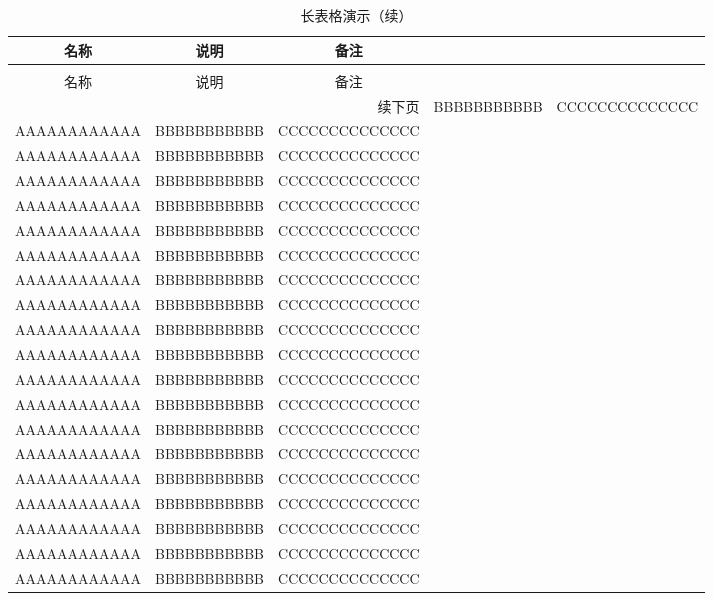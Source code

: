 \begin{longtable}[h]{ccc}
  \caption[长表格演示]{长表格演示}
  \label{tab:longtable}\\
  \toprule
  名称  & 说明 & 备注\\
  \midrule
  \endfirsthead
  \caption[]{长表格演示（续）} \\
  \toprule
  名称  & 说明 & 备注 \\
  \midrule
  \endhead
  \hline
  \multicolumn{3}{r}{\small 续下页}
  \endfoot
  \bottomrule
  \endlastfoot
  
  AAAAAAAAAAAA   &   BBBBBBBBBBB   &   CCCCCCCCCCCCCC   \\
  AAAAAAAAAAAA   &   BBBBBBBBBBB   &   CCCCCCCCCCCCCC   \\
  AAAAAAAAAAAA   &   BBBBBBBBBBB   &   CCCCCCCCCCCCCC   \\
  AAAAAAAAAAAA   &   BBBBBBBBBBB   &   CCCCCCCCCCCCCC   \\
  AAAAAAAAAAAA   &   BBBBBBBBBBB   &   CCCCCCCCCCCCCC   \\
  AAAAAAAAAAAA   &   BBBBBBBBBBB   &   CCCCCCCCCCCCCC   \\
  AAAAAAAAAAAA   &   BBBBBBBBBBB   &   CCCCCCCCCCCCCC   \\
  AAAAAAAAAAAA   &   BBBBBBBBBBB   &   CCCCCCCCCCCCCC   \\
  AAAAAAAAAAAA   &   BBBBBBBBBBB   &   CCCCCCCCCCCCCC   \\
  AAAAAAAAAAAA   &   BBBBBBBBBBB   &   CCCCCCCCCCCCCC   \\
  AAAAAAAAAAAA   &   BBBBBBBBBBB   &   CCCCCCCCCCCCCC   \\
  AAAAAAAAAAAA   &   BBBBBBBBBBB   &   CCCCCCCCCCCCCC   \\
  AAAAAAAAAAAA   &   BBBBBBBBBBB   &   CCCCCCCCCCCCCC   \\
  AAAAAAAAAAAA   &   BBBBBBBBBBB   &   CCCCCCCCCCCCCC   \\
  AAAAAAAAAAAA   &   BBBBBBBBBBB   &   CCCCCCCCCCCCCC   \\
  AAAAAAAAAAAA   &   BBBBBBBBBBB   &   CCCCCCCCCCCCCC   \\
  AAAAAAAAAAAA   &   BBBBBBBBBBB   &   CCCCCCCCCCCCCC   \\
  AAAAAAAAAAAA   &   BBBBBBBBBBB   &   CCCCCCCCCCCCCC   \\
  AAAAAAAAAAAA   &   BBBBBBBBBBB   &   CCCCCCCCCCCCCC   \\
  AAAAAAAAAAAA   &   BBBBBBBBBBB   &   CCCCCCCCCCCCCC   \\

\end{longtable}

